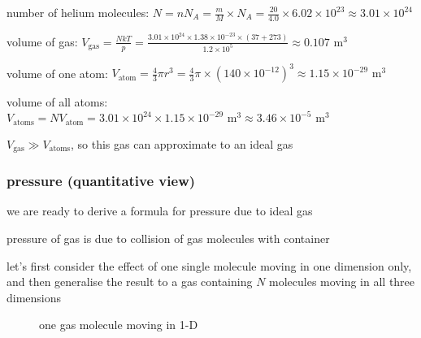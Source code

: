 \sol number of helium molecules: $N = nN_A = \frac{m}{M} \times N_A = \frac{20}{4.0} \times 6.02\times10^{23} \approx 3.01\times10^{24} $

\eqyskip

volume of gas: $V_\text{gas} = \frac{NkT}{p} = \frac{3.01\times10^{24}\times1.38\times10^{-23}\times (37+273)}{1.2\times10^5} \approx 0.107 \text{ m}^3$

\eqyskip

volume of one atom: $V_\text{atom} = \frac{4}{3}\pi r^3 = \frac{4}{3} \pi\times(140\times10^{-12})^3 \approx 1.15\times10^{-29} \text{ m}^3$

volume of all atoms: $V_\text{atoms} = N V_\text{atom} = 3.01\times10^{24} \times 1.15\times10^{-29} \text{ m}^3 \approx 3.46 \times 10^{-5} \text{ m}^{3}$

$V_\text{gas} \gg V_\text{atoms}$, so this gas can approximate to an ideal gas \eoe


\subsubsection{pressure (quantitative view)}

we are ready to derive a formula for pressure due to ideal gas

pressure of gas is due to collision of gas molecules with container

let's first consider the effect of one single molecule moving in one dimension only, and then generalise the result to a gas containing $N$ molecules moving in all three dimensions



\begin{figure}[ht]
\centering
{}

one gas molecule moving in 1-D
\end{figure}

